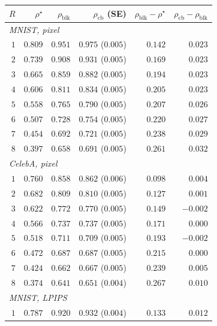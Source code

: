 \begin{table}[htbp]
    \centering\small
    \setlength{\tabcolsep}{5pt}
    \begin{tabular}{r rr r rr}
        \toprule
        $R$ & $\rho^\star$ & $\rho_{\mathrm{blk}}$ & $\rho_{\mathrm{cb}}$ (SE) & $\rho_{\mathrm{blk}}-\rho^\star$ & $\rho_{\mathrm{cb}}-\rho_{\mathrm{blk}}$ \\
        \midrule
        \multicolumn{6}{l}{\emph{MNIST, pixel}} \\
        $1$ & $0.809$ & $0.951$ & $0.975$ ($0.005$) & $0.142$ & $0.023$ \\
        $2$ & $0.739$ & $0.908$ & $0.931$ ($0.005$) & $0.169$ & $0.023$ \\
        $3$ & $0.665$ & $0.859$ & $0.882$ ($0.005$) & $0.194$ & $0.023$ \\
        $4$ & $0.606$ & $0.811$ & $0.834$ ($0.005$) & $0.205$ & $0.023$ \\
        $5$ & $0.558$ & $0.765$ & $0.790$ ($0.005$) & $0.207$ & $0.026$ \\
        $6$ & $0.507$ & $0.728$ & $0.754$ ($0.005$) & $0.220$ & $0.027$ \\
        $7$ & $0.454$ & $0.692$ & $0.721$ ($0.005$) & $0.238$ & $0.029$ \\
        $8$ & $0.397$ & $0.658$ & $0.691$ ($0.005$) & $0.261$ & $0.032$ \\
        \midrule
        \multicolumn{6}{l}{\emph{CelebA, pixel}} \\
        $1$ & $0.760$ & $0.858$ & $0.862$ ($0.006$) & $0.098$ & $0.004$ \\
        $2$ & $0.682$ & $0.809$ & $0.810$ ($0.005$) & $0.127$ & $0.001$ \\
        $3$ & $0.622$ & $0.772$ & $0.770$ ($0.005$) & $0.149$ & $-0.002$ \\
        $4$ & $0.566$ & $0.737$ & $0.737$ ($0.005$) & $0.171$ & $0.000$ \\
        $5$ & $0.518$ & $0.711$ & $0.709$ ($0.005$) & $0.193$ & $-0.002$ \\
        $6$ & $0.472$ & $0.687$ & $0.687$ ($0.005$) & $0.215$ & $0.000$ \\
        $7$ & $0.424$ & $0.662$ & $0.667$ ($0.005$) & $0.239$ & $0.005$ \\
        $8$ & $0.374$ & $0.641$ & $0.651$ ($0.004$) & $0.267$ & $0.010$ \\
        \midrule
        \multicolumn{6}{l}{\emph{MNIST, LPIPS}} \\
        $1$ & $0.787$ & $0.920$ & $0.932$ ($0.004$) & $0.133$ & $0.012$ \\

\end{tabular}
\end{table}
